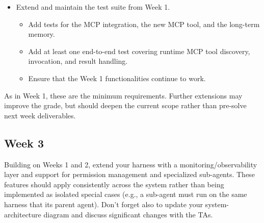 \documentclass{article}
\begin{document}
\begin{itemize}
    \begin{itemize}
        \item The agent must be able to store information during one session and retrieve relevant information in a later session, even after the application restarts.
        \item The mechanism to decide what and when to store and retrieve information from the long-term memory must be clearly stated.
    \end{itemize}
    \item Extend and maintain the test suite from Week 1.
    \begin{itemize}
        \item Add tests for the MCP integration, the new MCP tool, and the long-term memory.
        \item Add at least one end-to-end test covering runtime MCP tool discovery, invocation, and result handling.
        \item Ensure that the Week 1 functionalities continue to work.
    \end{itemize}
\end{itemize}

As in Week 1, these are the minimum requirements. Further extensions may improve the grade, but should deepen the current scope rather than pre-solve next week deliverables.

\subsection{Week 3}

Building on Weeks 1 and 2, extend your harness with a monitoring/observability layer and support for permission management and specialized sub-agents. These features should apply consistently across the system rather than being implemented as isolated special cases (e.g., a sub-agent must run on the same harness that its parent agent). Don't forget also to update your system-architecture diagram and discuss significant changes with the TAs.
\end{document}
